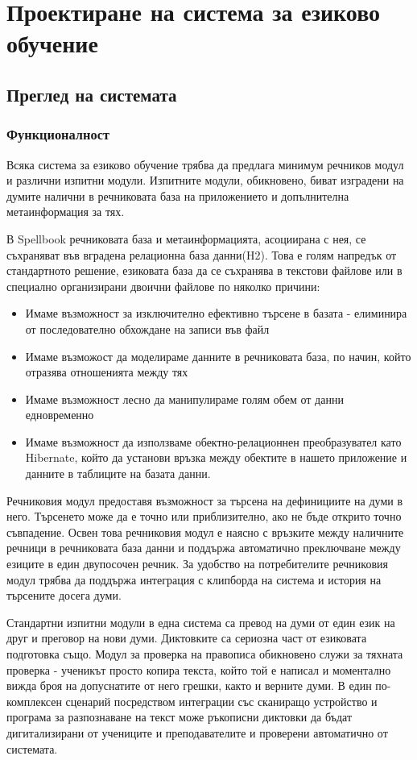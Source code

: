 \chapter{Проектиране на система за езиково обучение}
\section{Преглед на системата}
\subsection{Функционалност}
Всяка система за езиково обучение трябва да предлага минимум речников
модул и различни изпитни модули. Изпитните модули, обикновено, биват
изградени на думите налични в речниковата база на приложението и
допълнителна метаинформация за тях. 

В Spellbook речниковата база и метаинформацията, асоциирана с нея, се
съхраняват във вградена релационна база данни(H2). Това е голям
напредък от стандартното решение, езиковата база да се съхранява в
текстови файлове или в специално организирани двоични файлове по
няколко причини:
\begin{itemize}
  \item Имаме възможност за изключително ефективно търсене в базата -
    елиминира от последователно обхождане на записи във файл
  \item Имаме възможост да моделираме данните в речниковата база, по
    начин, който отразява отношенията между тях
  \item Имаме възможност лесно да манипулираме голям обем от данни
    едновременно
  \item Имаме възможност да използваме обектно-релационнен
    преобразувател като Hibernate, който да установи връзка между
    обектите в нашето приложение и данните в таблиците на базата данни.
\end{itemize}

Речниковия модул предоставя възможност за търсена на дефинициите на
думи в него. Търсенето може да е точно или приблизително, ако не бъде
открито точно съвпадение. Освен това речниковия модул е наясно с
връзките между наличните речници в речниковата база данни и поддържа
автоматично преключване между езиците в един двупосочен речник. За
удобство на потребителите речниковия модул трябва да поддържа
интеграция с клипборда на система и история на търсените досега думи.

Стандартни изпитни модули в една система са превод на думи от един
език на друг и преговор на нови думи. Диктовките са сериозна част от
езиковата подготовка също. Модул за проверка на правописа обикновено служи
за тяхната проверка - ученикът просто копира текста, който той е
написал и моментално вижда броя на допуснатите от него грешки, както и
верните думи. В един по-комплексен сценарий посредством интеграции със
сканиращо устройство и програма за разпознаване на текст може
ръкописни диктовки да бъдат дигитализирани от учениците и
преподавателите и проверени автоматично от системата. 

